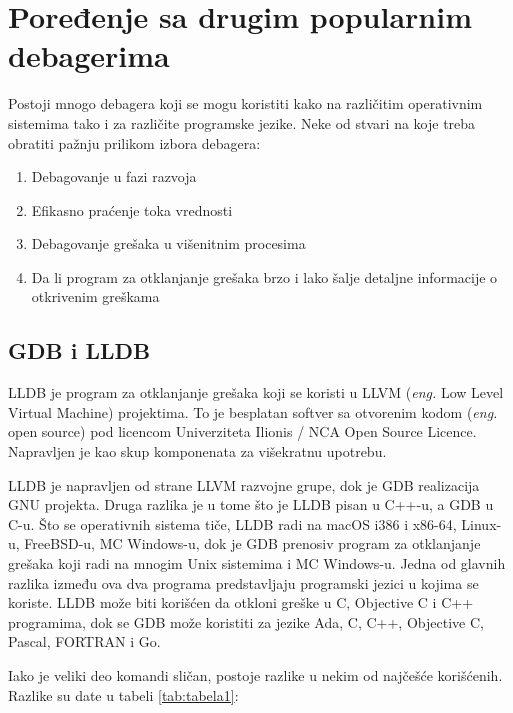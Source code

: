 \documentclass[a4paper]{article}
\begin{document}
\section{Poređenje sa drugim popularnim debagerima}
\label{sec:poredjenje}
Postoji mnogo debagera koji se mogu koristiti kako
na različitim operativnim sistemima tako i za različite programske jezike. 
Neke od stvari na koje treba obratiti pažnju prilikom izbora debagera\cite{tools}:

\begin{enumerate}
\item Debagovanje u fazi razvoja
\item Efikasno praćenje toka vrednosti
\item Debagovanje grešaka u višenitnim procesima
\item Da li program za otklanjanje grešaka brzo i lako šalje detaljne informacije o otkrivenim greškama
\end{enumerate}

\subsection{GDB i LLDB}
\label{subsec:lldb}
LLDB je program za otklanjanje grešaka koji se koristi u LLVM 
(\textit{eng.} Low Level Virtual Machine) projektima. To je besplatan softver sa 
otvorenim kodom (\textit{eng.} open source) pod licencom 
Univerziteta Ilionis / NCA Open Source Licence. Napravljen je kao 
skup komponenata za višekratnu upotrebu\cite{lldb}. 

LLDB je napravljen od strane LLVM razvojne grupe, dok je GDB 
realizacija GNU projekta. Druga razlika je u tome što je LLDB 
pisan u C++-u, a GDB u C-u. Što se operativnih sistema tiče, LLDB 
radi na macOS i386 i x86-64, Linux-u,  FreeBSD-u, MC Windows-u, 
dok je GDB prenosiv program za otklanjanje grešaka koji radi na 
mnogim Unix sistemima i MC Windows-u. Jedna od glavnih razlika 
između ova dva programa predstavljaju programski jezici u kojima 
se koriste. LLDB može biti korišćen da otkloni greške u C, Objective 
C i C++ programima, dok se GDB može koristiti za jezike  Ada, C, 
C++, Objective C, Pascal, FORTRAN i Go.

Iako je veliki deo komandi sličan, postoje razlike u nekim od 
najčešće korišćenih\cite{lldb}. Razlike su date u tabeli \ref{tab:tabela1}:
\end{document}
